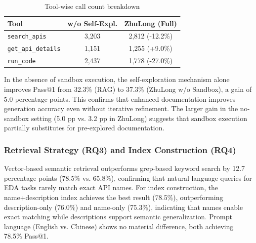 \begin{table}[htbp]
\centering
\caption{Tool-wise call count breakdown}
\label{tab:tool-breakdown}
\begin{tabular}{lcc}
\toprule
\textbf{Tool} & \textbf{w/o Self-Expl.} & \textbf{ZhuLong (Full)} \\
\midrule
\texttt{search\_apis} & 3,203 & 2,812 (-12.2\%) \\
\texttt{get\_api\_details} & 1,151 & 1,255 (+9.0\%) \\
\texttt{run\_code} & 2,437 & 1,778 (-27.0\%) \\
\bottomrule
\end{tabular}
\end{table}

In the absence of sandbox execution, the self-exploration mechanism alone improves Pass@1 from 32.3\% (RAG) to 37.3\% (ZhuLong w/o Sandbox), a gain of 5.0 percentage points. This confirms that enhanced documentation improves generation accuracy even without iterative refinement. The larger gain in the no-sandbox setting (5.0 pp vs. 3.2 pp in ZhuLong) suggests that sandbox execution partially substitutes for pre-explored documentation.

\subsubsection{Retrieval Strategy (RQ3) and Index Construction (RQ4)}

Vector-based semantic retrieval outperforms grep-based keyword search by 12.7 percentage points (78.5\% vs. 65.8\%), confirming that natural language queries for EDA tasks rarely match exact API names. For index construction, the name+description index achieves the best result (78.5\%), outperforming description-only (76.0\%) and name-only (75.3\%), indicating that names enable exact matching while descriptions support semantic generalization. Prompt language (English vs. Chinese) shows no material difference, both achieving 78.5\% Pass@1.

